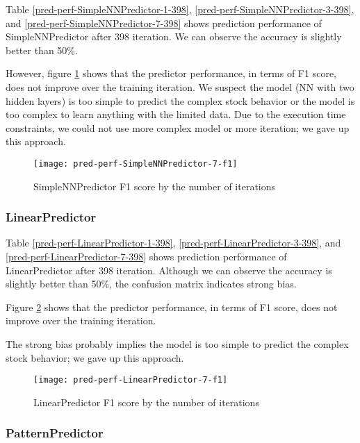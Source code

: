 \documentclass[twocolumn,10pt]{asme2ej}
\begin{document}
Table \ref{pred-perf-SimpleNNPredictor-1-398}, \ref{pred-perf-SimpleNNPredictor-3-398}, and
\ref{pred-perf-SimpleNNPredictor-7-398} shows prediction performance of
SimpleNNPredictor after 398 iteration. We can observe the accuracy is slightly better than 50\%.

However, figure \ref{pred-perf-SimpleNNPredictor-7-f1} shows that the
predictor performance, in terms of F1 score, does not improve over the
training iteration. We suspect the model (NN with two hidden layers)
is too simple to predict the complex stock behavior or the model is
too complex to learn anything with the limited data. Due to the
execution time constraints, we could not use more complex model or
more iteration; we gave up this approach.

\begin{figure}
  \centering
  \texttt{[image: pred-perf-SimpleNNPredictor-7-f1]}
  \caption{SimpleNNPredictor F1 score by the number of iterations}
  \label{pred-perf-SimpleNNPredictor-7-f1}
\end{figure}

\subsubsection{LinearPredictor}

Table \ref{pred-perf-LinearPredictor-1-398},
\ref{pred-perf-LinearPredictor-3-398}, and
\ref{pred-perf-LinearPredictor-7-398} shows prediction performance of
LinearPredictor after 398 iteration. Although we can observe the
accuracy is slightly better than 50\%, the confusion matrix indicates
strong bias.

Figure \ref{pred-perf-LinearPredictor-7-f1} shows that the predictor
performance, in terms of F1 score, does not improve over the training
iteration. 

The strong bias probably implies the model is too simple to predict
the complex stock behavior; we gave up this approach.

\begin{figure}
  \centering
  \texttt{[image: pred-perf-LinearPredictor-7-f1]}
  \caption{LinearPredictor F1 score by the number of iterations}
  \label{pred-perf-LinearPredictor-7-f1}
\end{figure}

\subsubsection{PatternPredictor}
\end{document}
